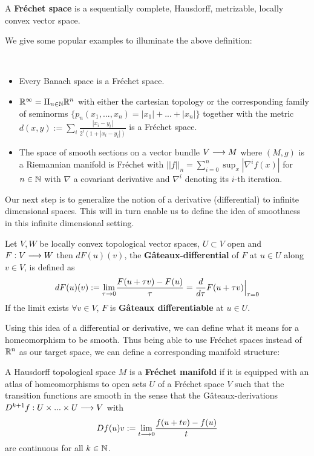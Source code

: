 \begin{definition}
  A \textbf{Fréchet space} is a sequentially complete, Hausdorff, metrizable, locally convex vector space.
\end{definition}

We give some popular examples to illuminate the above definition:

\begin{example}~
\begin{itemize}
  \item Every Banach space is a Fréchet space.
  \item $\mathbb{R}^\infty = \Pi_{n\in \mathbb{N}} \mathbb{R}^n$ with either the cartesian topology or the corresponding family of seminorms $\{p_n(x_1,...,x_n) = |x_1| + ... + |x_n| \}$ together with the metric $d(x,y) := \sum_i \frac{|x_i - y_i|}{2^i (1+|x_i - y_i|)}$ is a Fréchet space.
  \item The space of smooth sections on a vector bundle $V \longrightarrow M$ where $(M,g)$ is a Riemannian manifold is Fréchet with $||f||_n = \sum_{i=0}^n \sup_x |\nabla^i f(x)|$ for $n\in \mathbb{N}$ with $\nabla$ a covariant derivative and $\nabla^i$ denoting its $i$-th iteration.
\end{itemize}
\end{example}

Our next step is to generalize the notion of a derivative (differential) to infinite dimensional spaces. This will in turn enable us to define the idea of smoothness in this infinite dimensional setting.

\begin{definition}
  Let $V,W$ be locally convex topological vector spaces, $U\subset V$ open and $F:V \longrightarrow W$ then $dF(u)(v)$, the \textbf{Gâteaux-differential} of $F$ at $u\in U$ along $v\in V$, is defined as
  $$dF(u)(v) := \underset{\tau \rightarrow 0}{\lim} \frac{F(u+\tau v) - F(u)}{\tau} = \frac{d }{d \tau} F(u+\tau v) \Big|_{\tau = 0}$$
  If the limit exists $\forall v \in V$, $F$ is \textbf{Gâteaux differentiable} at $u \in U$.
\end{definition}

Using this idea of a differential or derivative, we can define what it means for a homeomorphism to be smooth. Thus being able to use Fréchet spaces instead of $\mathbb{R}^n$ as our target space, we can define a corresponding manifold structure:

\begin{definition}
\label{def:Frechet_manifolds}
  A Hausdorff topological space $M$ is a \textbf{Fréchet manifold} if it is equipped with an atlas of homeomorphisms to open sets $U$ of a Fréchet space $V$ such that the transition functions are smooth in the sense that the Gâteaux-derivations $D^{k+1}f:U \times ... \times U \longrightarrow V$ with
  $$ Df(u)v := \underset{t \longrightarrow 0}{\lim} \frac{f(u+tv)-f(u)}{t} $$
  are continuous for all $k\in \mathbb{N}$.
\end{definition}

